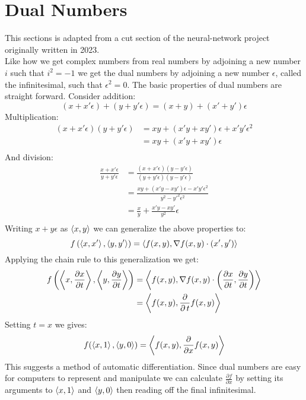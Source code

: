 
\section{Dual Numbers}
This sections is adapted from a cut section of the neural-network project originally written in 2023.
\\

Like how we get complex numbers from real numbers by adjoining a new number $i$ such that $i^2=-1$ we get the dual numbers by adjoining a new number $\epsilon$, 
called the infinitesimal, 
such that $\epsilon^2 = 0$.
The basic properties of dual numbers are straight forward.
Consider addition:
\[(x+x'\epsilon) + (y+y'\epsilon) = (x+y)+(x'+y')\epsilon\]
Multiplication:
\[\begin{aligned}
(x+x'\epsilon)(y+y'\epsilon) &= xy+(x'y+xy')\epsilon+x'y'\epsilon^2 \\
&= xy+(x'y+xy')\epsilon \\
\end{aligned}\]
And division:
\[\begin{aligned}
\frac{x+x'\epsilon}{y+y'\epsilon} &= \frac{(x+x'\epsilon)(y-y'\epsilon)}{(y+y'\epsilon)(y-y'\epsilon)} \\
 &= \frac{xy+(x'y-xy')\epsilon-x'y'\epsilon^2}{y^2-y'^2\epsilon^2} \\
 &= \frac{x}{y}+\frac{x'y-xy'}{y^2}\epsilon \\
\end{aligned}\]
Writing $x+y\epsilon$ as $\left\langle x,y \right\rangle$ we can generalize the above properties to:
\[f\left(\left\langle x,x' \right\rangle,\left\langle y,y' \right\rangle\right) = \left\langle f(x,y),\nabla f(x,y) \cdot (x',y') \right\rangle\]
Applying the chain rule to this generalization we get:
\[\begin{aligned}
	f\left(\left\langle x,\frac{\partial x}{\partial t} \right\rangle,\left\langle y,\frac{\partial y}{\partial t} \right\rangle\right) &=
	\left\langle f(x,y),\nabla f(x,y) \cdot \left(\frac{\partial x}{\partial t},\frac{\partial y}{\partial t}\right) \right\rangle \\
	&= \left\langle f(x,y),\frac{\partial }{\partial \,t}f(x,y) \right\rangle \\
\end{aligned}\]
Setting $t=x$ we gives:
\[f(\left\langle x,1 \right\rangle,\left\langle y,0 \right\rangle) = \left\langle f(x,y),\frac{\partial}{\partial x}f(x,y) \right\rangle\]
This suggests a method of automatic differentiation.
Since dual numbers are easy for computers to represent and manipulate we can calculate $\frac{\partial f}{\partial x}$ by setting its arguments to $\left\langle x,1 \right\rangle$ and $\left\langle y,0 \right\rangle$ then reading off the final infinitesimal.

